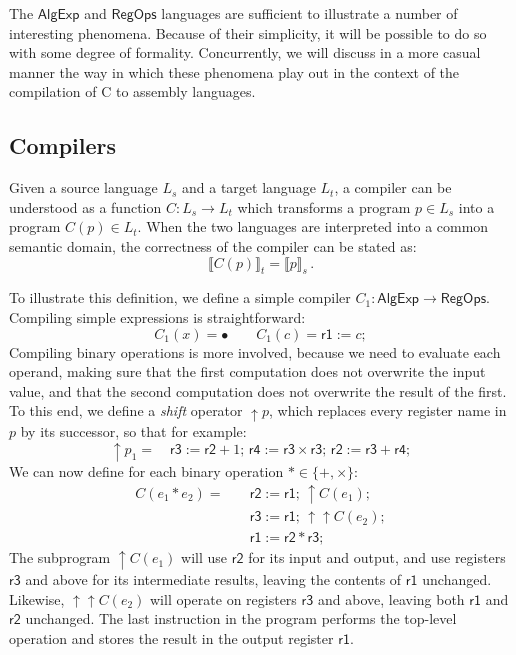 \documentclass[sigplan,10pt,review,anonymous]{acmart}
\newcommand{\kw}[1]{\ensuremath{ \textsf{#1} }}
\begin{document}
The $\kw{AlgExp}$ and $\kw{RegOps}$ languages
are sufficient to illustrate a number of interesting phenomena.
Because of their simplicity,
it will be possible to do so with some degree of formality.
Concurrently,
we will discuss in a more casual manner
the way in which these phenomena play out
in the context of the compilation of C to assembly languages.


\subsection{Compilers} %

Given a source language $L_s$
and a target language $L_t$,
a compiler can be understood as a function
$C : L_s \rightarrow L_t$
which transforms a program $p \in L_s$
into a program $C(p) \in L_t$.
When the two languages are interpreted into
a common semantic domain,
the correctness of the compiler can be stated as:
\[ \llbracket C(p) \rrbracket_t =
    \llbracket p \rrbracket_s \,. \]

\begin{example}[\kw{AlgExp} to \kw{RegOps}] %
To illustrate this definition,
we define a simple compiler $C_1 : \kw{AlgExp} \rightarrow \kw{RegOps}$.
Compiling simple expressions is straightforward:
\[
  C_1(x) = \bullet \qquad
  C_1(c) = \kw{r1} := c;
\]
Compiling binary operations is more involved,
because we need to evaluate each operand,
making sure that the first computation does not overwrite
the input value,
and that the second computation does not overwrite
the result of the first.
To this end,
we define a \emph{shift} operator ${\uparrow} p$,
which replaces every register name in $p$ by its successor,
so that for example:
\[
  {\uparrow} p_1 = \quad
  \kw{r3} := \kw{r2} + 1; \,
  \kw{r4} := \kw{r3} \times \kw{r3}; \,
  \kw{r2} := \kw{r3} + \kw{r4};
\]
We can now define for each binary operation $* \in \{+, \times\}$:
\begin{align*}
  C(e_1 * e_2) = \quad  %
    &\kw{r2} := \kw{r1}; \, %
    {\uparrow} C(e_1); \\
    &\kw{r3} := \kw{r1}; \,
    {\uparrow\uparrow} C(e_2); \\
    &\kw{r1} := \kw{r2} * \kw{r3};
\end{align*}
The subprogram ${\uparrow} C(e_1)$
will use $\kw{r2}$ for its input and output,
and use registers $\kw{r3}$ and above for its intermediate results,
leaving the contents of $\kw{r1}$ unchanged.
Likewise,
${\uparrow\uparrow} C(e_2)$
will operate on registers $\kw{r3}$ and above,
leaving both $\kw{r1}$ and $\kw{r2}$ unchanged.
The last instruction in the program performs
the top-level operation and stores the result
in the output register $\kw{r1}$.
\end{example}
\end{document}
